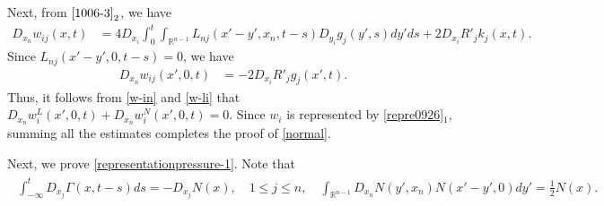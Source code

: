 \documentclass{amsart}
\numberwithin{equation}{section}
\newcommand{\Rn}{{\mathbb R}^{n-1}}
\newcommand{\Ga}{\Gamma}
\begin{document}
Next, from $\eqref{1006-3}_2$,  we have 
\begin{align*}
D_{x_n} w_{ij}(x,t) &= 4 D_{x_i} \int_0^t \int_{\Rn} L_{nj}(x'-y', x_n, t-s) D_{y_i} g_j(y',s) dy' ds + 2 D_{x_i} R'_j k_j(x,t).
\end{align*}
Since $L_{nj}(x'-y',0, t-s) = 0$, we have 
\begin{align*}
D_{x_n} w_{ij}(x',0,t) &= -2 D_{x_i}R'_j g_j(x',t).
\end{align*}
Thus, it follows from \eqref{w-in} and \eqref{w-li} that $D_{x_n} w^L_{i}(x',0,t) +D_{x_n} w^N_i(x', 0,t) =0$.
Since $w_i$ is represented by \eqref{repre0926}$_1$, summing all the estimates completes the proof of  \eqref{normal}.

Next, we prove \eqref{representationpressure-1}.  Note that 
\begin{align}\label{1027-1}
\begin{split}
\int_{-\infty}^t  D_{x_j}\Ga(x,t-s) ds = - D_{x_j}N(x),\quad 1 \leq j \leq n, \quad \int_{\Rn} D_{x_n} N(y', x_n) N(x'-y',0) dy'=  \frac12 N(x).
\end{split}
\end{align}
\end{document}
